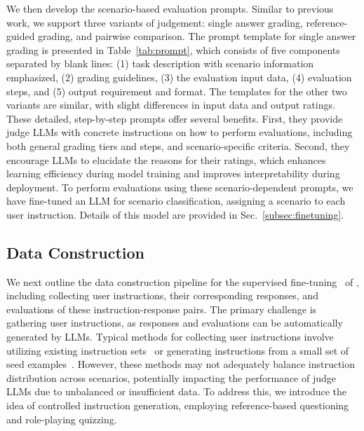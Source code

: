 We then develop the scenario-based evaluation prompts. Similar to previous work, we support three variants of judgement: single answer grading, reference-guided grading, and pairwise comparison. The prompt template for single answer grading is presented in Table~\ref{tab:prompt}, which consists of five components separated by blank lines: (1) task description with scenario information emphasized, (2) grading guidelines, (3) the evaluation input data, (4) evaluation steps, and (5) output requirement and format. The templates for the other two variants are similar, with slight differences in input data and output ratings. %
These detailed, step-by-step prompts offer several benefits. First, they provide judge LLMs with concrete instructions on how to perform evaluations, including both general grading tiers and steps, and scenario-specific criteria.  Second, they encourage LLMs to elucidate the reasons for their ratings, which enhances learning efficiency during model training and improves interpretability during deployment. 
To perform evaluations using these scenario-dependent prompts, we have fine-tuned an LLM for scenario classification, \ie assigning a scenario to each user instruction. Details of this model are provided in Sec.~\ref{subsec:finetuning}.


\subsection{Data Construction}
\label{subsec:datacons}

We next outline the data construction pipeline for the supervised fine-tuning~\cite{ouyang2022instructGPT} of \modelname, including collecting user instructions, their corresponding responses, and evaluations of these instruction-response pairs. The primary challenge is gathering user instructions, as responses and evaluations can be automatically generated by LLMs.
Typical methods for collecting user instructions involve utilizing existing instruction sets~\cite{zheng2024lmsyschat1m,li2023autoj,ke2024critiquellm} or generating instructions from a small set of seed examples~\cite{wang2023selfinstruct,alpaca}. However, these methods may not adequately balance instruction distribution across scenarios, potentially impacting  the performance of judge LLMs due to unbalanced or insufficient data. To address this, we introduce the idea of controlled instruction generation, employing reference-based questioning and role-playing quizzing.



